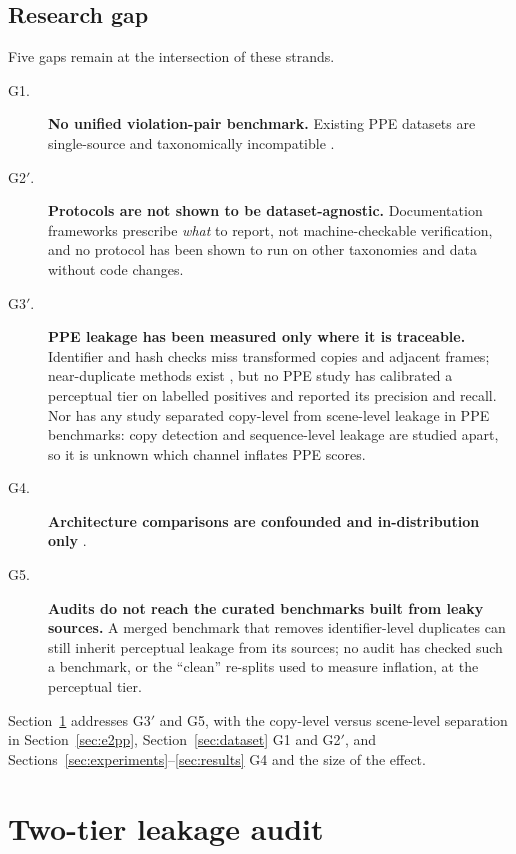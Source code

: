 \documentclass[review,12pt]{elsarticle}
\begin{document}
\subsection{Research gap}
\label{sec:gap}
Five gaps remain at the intersection of these strands.
\begin{description}
\item[G1.] \textbf{No unified violation-pair benchmark.} Existing PPE
datasets are single-source and taxonomically incompatible
\citep{wu2019gdut,otgonbold2022shel5k,wang2021chv,ferdous2022ppe}.
\item[G2$'$.] \textbf{Protocols are not shown to be dataset-agnostic.}
Documentation frameworks
\citep{gebru2021datasheets,paullada2021data} prescribe \emph{what} to
report, not machine-checkable verification, and no protocol has been
shown to run on other taxonomies and data without code changes.
\item[G3$'$.] \textbf{PPE leakage has been measured only where it is
traceable.} Identifier and hash checks miss transformed copies and
adjacent frames; near-duplicate methods exist
\citep{barz2020train,oquab2024dinov2,farid2021perceptual}, but no PPE
study has calibrated a perceptual tier on labelled positives and
reported its precision and recall. Nor has any study separated
copy-level from scene-level leakage in PPE benchmarks: copy detection
\citep{barz2020train} and sequence-level leakage
\citep{yagis2021effect,tampu2022inflation} are studied apart, so it is
unknown which channel inflates PPE scores.
\item[G4.] \textbf{Architecture comparisons are confounded and
in-distribution only} \citep{vukicevic2024review,koh2021wilds}.
\item[G5.] \textbf{Audits do not reach the curated benchmarks built
from leaky sources.} A merged benchmark that removes identifier-level
duplicates can still inherit perceptual leakage from its sources; no
audit has checked such a benchmark, or the ``clean'' re-splits used to
measure inflation, at the perceptual tier.
\end{description}
Section~\ref{sec:audit} addresses G3$'$ and G5, with the copy-level
versus scene-level separation in Section~\ref{sec:e2pp},
Section~\ref{sec:dataset} G1 and G2$'$, and
Sections~\ref{sec:experiments}--\ref{sec:results} G4 and the size of
the effect.

\section{Two-tier leakage audit}
\label{sec:audit}
\end{document}
